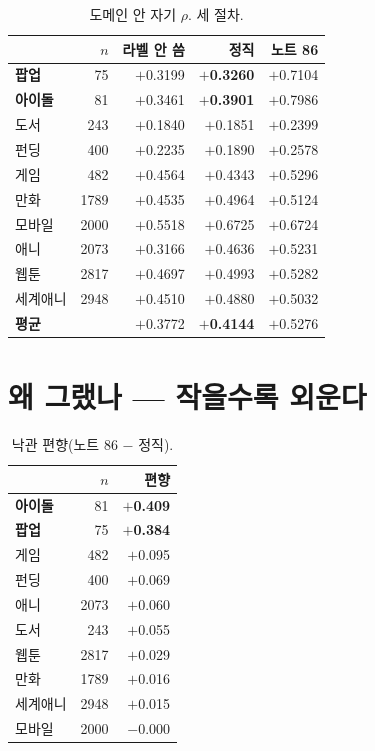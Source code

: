 \documentclass[10pt]{article}
\begin{document}
\begin{table}[t]
\centering\tsize
\caption{도메인 안 자기 $\rho$. 세 절차.}
\begin{tabular}{lrrrr}
\toprule
& $n$ & 라벨 안 씀 & \textbf{정직} & 노트 86 \\
\midrule
\textbf{팝업} & 75 & $+$0.3199 & \textbf{$+$0.3260} & $+$0.7104 \\
\textbf{아이돌} & 81 & $+$0.3461 & \textbf{$+$0.3901} & $+$0.7986 \\
도서 & 243 & $+$0.1840 & $+$0.1851 & $+$0.2399 \\
펀딩 & 400 & $+$0.2235 & $+$0.1890 & $+$0.2578 \\
게임 & 482 & $+$0.4564 & $+$0.4343 & $+$0.5296 \\
만화 & 1789 & $+$0.4535 & $+$0.4964 & $+$0.5124 \\
모바일 & 2000 & $+$0.5518 & $+$0.6725 & $+$0.6724 \\
애니 & 2073 & $+$0.3166 & $+$0.4636 & $+$0.5231 \\
웹툰 & 2817 & $+$0.4697 & $+$0.4993 & $+$0.5282 \\
세계애니 & 2948 & $+$0.4510 & $+$0.4880 & $+$0.5032 \\
\midrule
\textbf{평균} & & $+$0.3772 & \textbf{$+$0.4144} & $+$0.5276 \\
\bottomrule
\end{tabular}
\end{table}


\section{왜 그랬나 --- 작을수록 외운다}

\begin{table}[t]
\centering\tsize
\caption{낙관 편향(노트 86 $-$ 정직).}
\begin{tabular}{lrr}
\toprule
& $n$ & 편향 \\
\midrule
\textbf{아이돌} & 81 & \textbf{$+$0.409} \\
\textbf{팝업} & 75 & \textbf{$+$0.384} \\
게임 & 482 & $+$0.095 \\
펀딩 & 400 & $+$0.069 \\
애니 & 2073 & $+$0.060 \\
도서 & 243 & $+$0.055 \\
웹툰 & 2817 & $+$0.029 \\
만화 & 1789 & $+$0.016 \\
세계애니 & 2948 & $+$0.015 \\
모바일 & 2000 & $-$0.000 \\
\bottomrule
\end{tabular}
\end{table}
\end{document}
